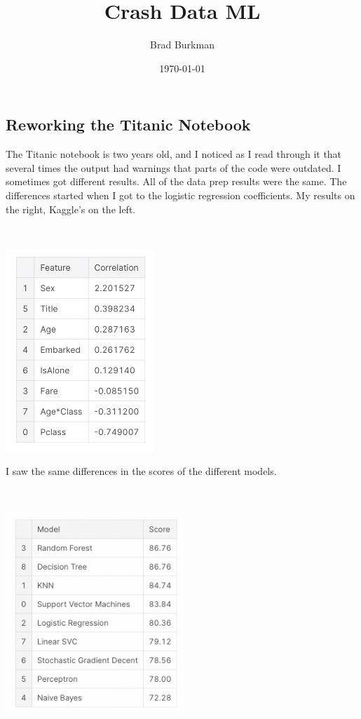 \documentclass[11pt]{article}
\title{Crash Data ML}
\author{Brad Burkman}
\date{\today}
\begin{document}
\setlength{\parindent}{20pt}
\begin{spacing}{1.2}
\maketitle
\tableofcontents

\section{Reworking the Titanic Notebook}

The Titanic notebook is two years old, and I noticed as I read through it that several times the output had warnings that parts of the code were outdated.  I sometimes got different results.  All of the data prep results were the same.  The differences started when I got to the logistic regression coefficients.  My results on the right, Kaggle's on the left.

\


\vskip -2.5in
\hfill\includegraphics[height=3in]{TitanicLogisticRegressionTable.png}

\newpage

I saw the same differences in the scores of the different models.  

\


\vskip -2.5in
\hfill\includegraphics[height=3in]{TitanicModelsTable.png}


\end{spacing}
\end{document}
